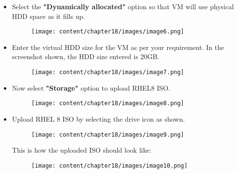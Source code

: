 \begin{flushleft}
\begin{itemize}
	\item Select the \textbf{"Dynamically allocated"} option so that VM will use physical HDD space as it fills up.
	
	\begin{figure}[h!]
		\centering
		\texttt{[image: content/chapter18/images/image6.png]}
	\end{figure}		
	
	\newpage
	
	\item Enter the virtual HDD size for the VM as per your requirement. In the screenshot shown, the HDD size entered is 20GB.
	
	\begin{figure}[h!]
		\centering
		\texttt{[image: content/chapter18/images/image7.png]}
	\end{figure}		
	
	\item Now select \textbf{"Storage"} option to upload RHEL8 ISO.
	\begin{figure}[h!]
		\centering
		\texttt{[image: content/chapter18/images/image8.png]}
	\end{figure}		
	

	\item Upload RHEL 8 ISO by selecting the drive icon as shown.
	\begin{figure}[h!]
		\centering
		\texttt{[image: content/chapter18/images/image9.png]}
	\end{figure}		
	
	\newpage
	This is how the uploaded ISO should look like:
	\begin{figure}[h!]
		\centering
		\texttt{[image: content/chapter18/images/image10.png]}
	\end{figure}		
	
\end{itemize} 
 
\end{flushleft}


